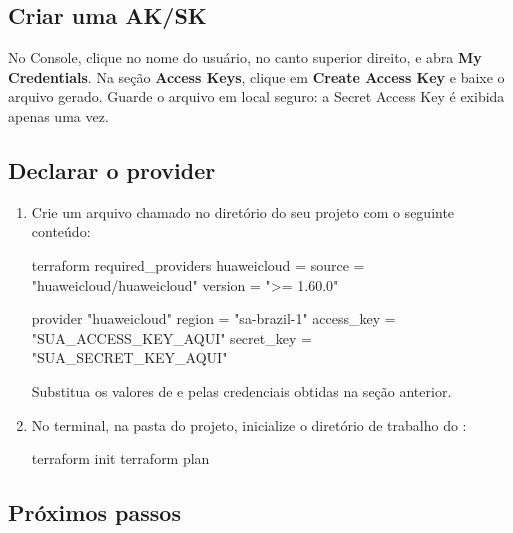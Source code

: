 \documentclass{guide}
\begin{document}
\subsection{Criar uma AK/SK}


No Console, clique no nome do usuário, no canto superior direito, e abra
\textbf{My Credentials}. Na seção \textbf{Access Keys}, clique em
\textbf{Create Access Key} e baixe o arquivo gerado. Guarde o arquivo em local
seguro: a Secret Access Key é exibida apenas uma vez.

\subsection{Declarar o provider}

\passoapasso
\begin{enumerate}
  \item Crie um arquivo chamado  no diretório do seu
        projeto com o seguinte conteúdo:

\begin{codigo}
terraform {
  required_providers {
    huaweicloud = {
      source  = "huaweicloud/huaweicloud"
      version = ">= 1.60.0"
    }
  }
}

provider "huaweicloud" {
  region     = "sa-brazil-1"
  access_key = "SUA_ACCESS_KEY_AQUI"
  secret_key = "SUA_SECRET_KEY_AQUI"
}
\end{codigo}

  Substitua os valores de  e  pelas
  credenciais obtidas na seção anterior.

  \item No terminal, na pasta do projeto, inicialize o diretório de trabalho
        do :

\begin{codigo}[bash]
terraform init
terraform plan
\end{codigo}

\end{enumerate}

\subsection{Próximos passos}
\end{document}
